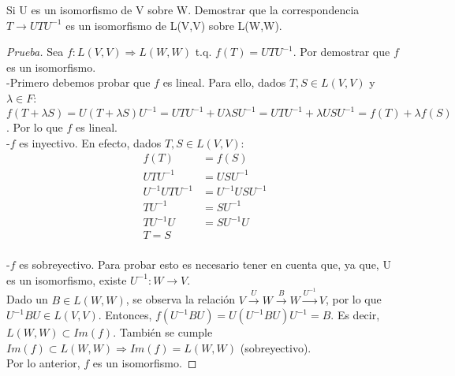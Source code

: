 \documentclass[12pt]{article}
\newenvironment{problem}[2][Problem]{\begin{trivlist}
\item[\hskip \labelsep {\bfseries #1}\hskip \labelsep {\bfseries #2.}]}{\end{trivlist}}
\begin{document}
\begin{problem}{3.2}
Si U es un isomorfismo de V sobre W. Demostrar que la correspondencia  $T \longrightarrow UTU^{-1}$  es un isomorfismo de L(V,V) sobre L(W,W).
\end{problem}

\begin{proof} [Prueba]
Sea $f:L(V,V) \Longrightarrow L(W,W)$ t.q. $f(T)=UTU^{-1}$. Por demostrar que $f$ es un isomorfismo.\\

-Primero debemos probar que $f$ es lineal. Para ello, dados $T,S \in L(V,V)$ y $\lambda \in F$: $f(T+\lambda S)=U(T+\lambda S)U^{-1}
	=UTU^{-1}+U\lambda SU^{-1}=UTU^{-1}+\lambda USU^{-1}
	=f(T)+\lambda f(S)$. Por lo que $f$ es lineal.\\
	
-$f$ es inyectivo. En efecto, dados $T, S \in L(V,V)$: 
\begin{align*}
f(T) & = f(S) \\
UTU^{-1} & = USU^{-1}\\
U^{-1}UTU^{-1} & = U^{-1}USU^{-1}\\
TU^{-1} & = SU^{-1}\\
TU^{-1}U & = SU^{-1}U\\
T=S
\end{align*}\\

-$f$ es sobreyectivo. Para probar esto es necesario tener en cuenta que, ya que, U es un isomorfismo, existe $U^{-1}:W \rightarrow V$. \\
Dado un $B \in L(W,W)$, se observa la relación $V \xrightarrow{U} W \xrightarrow{B} W \xrightarrow{U^{-1}} V$, por lo que $U^{-1}BU \in L(V,V)$. Entonces, $f(U^{-1}BU)=U(U^{-1}BU)U^{-1}=B$. Es decir, $L(W,W) \subset Im(f)$. También se cumple $Im(f) \subset L(W,W) \Longrightarrow Im(f)=L(W,W)$ (sobreyectivo).\\
Por lo anterior, $f$ es un isomorfismo.
\end{proof} 


\end{document}
